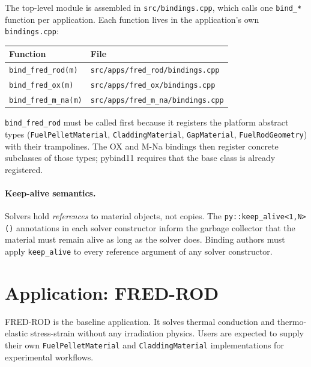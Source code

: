 \documentclass[11pt,a4paper]{article}
\begin{document}
The top-level module is assembled in \texttt{src/bindings.cpp}, which calls one \texttt{bind\_*} function per application.  Each function lives in the application's own \texttt{bindings.cpp}:

\begin{center}
\begin{tabular}{ll}
  \toprule
  Function & File \\
  \midrule
  \texttt{bind\_fred\_rod(m)}    & \texttt{src/apps/fred\_rod/bindings.cpp} \\
  \texttt{bind\_fred\_ox(m)}     & \texttt{src/apps/fred\_ox/bindings.cpp} \\
  \texttt{bind\_fred\_m\_na(m)}  & \texttt{src/apps/fred\_m\_na/bindings.cpp} \\
  \bottomrule
\end{tabular}
\end{center}

\texttt{bind\_fred\_rod} must be called first because it registers the platform abstract types (\texttt{FuelPelletMaterial}, \texttt{CladdingMaterial}, \texttt{GapMaterial}, \texttt{FuelRodGeometry}) with their trampolines.  The OX and M-Na bindings then register concrete subclasses of those types; pybind11 requires that the base class is already registered.

\paragraph{Keep-alive semantics.}
Solvers hold \emph{references} to material objects, not copies.  The \texttt{py::keep\_alive<1,N>()} annotations in each solver constructor inform the garbage collector that the material must remain alive as long as the solver does.  Binding authors must apply \texttt{keep\_alive} to every reference argument of any solver constructor.

\section{Application: FRED-ROD}
\label{sec:fred_rod}

FRED-ROD is the baseline application.  It solves thermal conduction and thermo-elastic stress-strain without any irradiation physics.  Users are expected to supply their own \texttt{FuelPelletMaterial} and \texttt{CladdingMaterial} implementations for experimental workflows.
\end{document}
